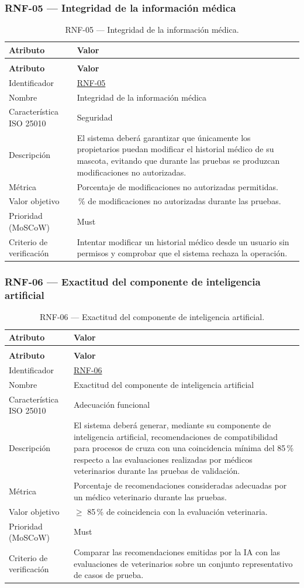 \documentclass[journal,onecolumn]{IEEEtran}
\makeatletter
\newenvironment{atributos}[2]{%
	\small
	\begin{longtable}{@{}>{\raggedright\arraybackslash}p{4.2cm} >{\raggedright\arraybackslash}p{11.2cm}@{}}
		\caption{#2}\label{tab:#1}\\
		\toprule
		\textbf{Atributo} & \textbf{Valor} \\
		\midrule
		\endfirsthead
		\multicolumn{2}{@{}l}{\small\itshape (continuación)}\\
		\toprule
		\textbf{Atributo} & \textbf{Valor} \\
		\midrule
		\endhead
		\bottomrule
		\endlastfoot
	}{%
	\end{longtable}
	\normalsize
}
\makeatother
\begin{document}
	\subsubsection{RNF-05 --- Integridad de la información médica}
	
	\begin{atributos}{RNF-05}{RNF-05 --- Integridad de la información médica.}
		Identificador & \hyperref[tab:RNF-05]{RNF-05} \\
		Nombre & Integridad de la información médica \\
		Característica ISO 25010 & Seguridad \\
		Descripción & El sistema deberá garantizar que únicamente los propietarios puedan modificar el historial médico de su mascota, evitando que durante las pruebas se produzcan modificaciones no autorizadas. \\
		Métrica & Porcentaje de modificaciones no autorizadas permitidas. \\
		Valor objetivo & 0\,\% de modificaciones no autorizadas durante las pruebas. \\
		Prioridad (MoSCoW) & Must \\
		Criterio de verificación & Intentar modificar un historial médico desde un usuario sin permisos y comprobar que el sistema rechaza la operación. \\
	\end{atributos}
	
	\subsubsection{RNF-06 --- Exactitud del componente de inteligencia artificial}
	
	\begin{atributos}{RNF-06}{RNF-06 --- Exactitud del componente de inteligencia artificial.}
		Identificador & \hyperref[tab:RNF-06]{RNF-06} \\
		Nombre & Exactitud del componente de inteligencia artificial \\
		Característica ISO 25010 & Adecuación funcional \\
		Descripción & El sistema deberá generar, mediante su componente de inteligencia artificial, recomendaciones de compatibilidad para procesos de cruza con una coincidencia mínima del 85\,\% respecto a las evaluaciones realizadas por médicos veterinarios durante las pruebas de validación. \\
		Métrica & Porcentaje de recomendaciones consideradas adecuadas por un médico veterinario durante las pruebas. \\
		Valor objetivo & $\geq$ 85\,\% de coincidencia con la evaluación veterinaria. \\
		Prioridad (MoSCoW) & Must \\
		Criterio de verificación & Comparar las recomendaciones emitidas por la IA con las evaluaciones de veterinarios sobre un conjunto representativo de casos de prueba. \\
	\end{atributos}
	
\end{document}

